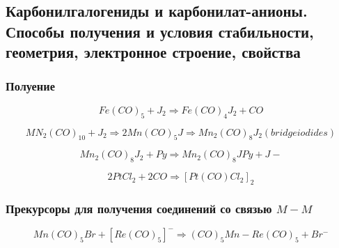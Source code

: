 \subsection{ Карбонилгалогениды и карбонилат-анионы. Способы получения и условия стабильности, геометрия, электронное строение, свойства}

\subsubsection*{Полуение}

$$Fe(CO)_5 + J_2 \Rightarrow Fe(CO)_4J_2 + CO$$

$$MN_2(CO)_{10} + J_2 \Rightarrow 2 Mn(CO)_5J \Rightarrow Mn_2(CO)_8J_2(bridge iodides)$$

$$Mn_2(CO)_8J_2 + Py \Rightarrow Mn_2(CO)_8JPy + J-$$

$$2PtCl_2 + 2CO \Rightarrow [Pt(CO)Cl_2]_2$$

\subsubsection*{Прекурсоры для получения соединений со связью $M-M$}

$$Mn(CO)_5Br + [Re(CO)_5]^- \Rightarrow (CO)_5Mn-Re(CO)_5 + Br^-$$





